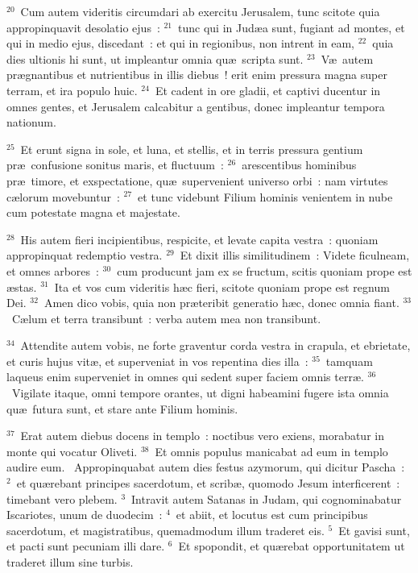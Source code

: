 ${}^{20}$~Cum autem videritis circumdari ab exercitu Jerusalem, tunc scitote quia appropinquavit desolatio ejus~:
${}^{21}$~tunc qui in Jud\ae a sunt, fugiant ad montes, et qui in medio ejus, discedant~: et qui in regionibus, non intrent in eam,
${}^{22}$~quia dies ultionis hi sunt, ut impleantur omnia qu\ae\ scripta sunt.
${}^{23}$~V\ae\ autem pr\ae gnantibus et nutrientibus in illis diebus~! erit enim pressura magna super terram, et ira populo huic.
${}^{24}$~Et cadent in ore gladii, et captivi ducentur in omnes gentes, et Jerusalem calcabitur a gentibus, donec impleantur tempora nationum.


${}^{25}$~Et erunt signa in sole, et luna, et stellis, et in terris pressura gentium pr\ae\ confusione sonitus maris, et fluctuum~:
${}^{26}$~arescentibus hominibus pr\ae\ timore, et exspectatione, qu\ae\ supervenient universo orbi~: nam virtutes c\ae lorum movebuntur~:
${}^{27}$~et tunc videbunt Filium hominis venientem in nube cum potestate magna et majestate.


${}^{28}$~His autem fieri incipientibus, respicite, et levate capita vestra~: quoniam appropinquat redemptio vestra.
${}^{29}$~Et dixit illis similitudinem~: Videte ficulneam, et omnes arbores~:
${}^{30}$~cum producunt jam ex se fructum, scitis quoniam prope est \ae stas.
${}^{31}$~Ita et vos cum videritis h\ae c fieri, scitote quoniam prope est regnum Dei.
${}^{32}$~Amen dico vobis, quia non pr\ae teribit generatio h\ae c, donec omnia fiant.
${}^{33}$~C\ae lum et terra transibunt~: verba autem mea non transibunt.


${}^{34}$~Attendite autem vobis, ne forte graventur corda vestra in crapula, et ebrietate, et curis hujus vit\ae , et superveniat in vos repentina dies illa~:
${}^{35}$~tamquam laqueus enim superveniet in omnes qui sedent super faciem omnis terr\ae .
${}^{36}$~Vigilate itaque, omni tempore orantes, ut digni habeamini fugere ista omnia qu\ae\ futura sunt, et stare ante Filium hominis.


${}^{37}$~Erat autem diebus docens in templo~: noctibus vero exiens, morabatur in monte qui vocatur Oliveti.
${}^{38}$~Et omnis populus manicabat ad eum in templo audire eum.
~Appropinquabat autem dies festus azymorum, qui dicitur Pascha~:
${}^{2}$~et qu\ae rebant principes sacerdotum, et scrib\ae , quomodo Jesum interficerent~: timebant vero plebem.
${}^{3}$~Intravit autem Satanas in Judam, qui cognominabatur Iscariotes, unum de duodecim~:
${}^{4}$~et abiit, et locutus est cum principibus sacerdotum, et magistratibus, quemadmodum illum traderet eis.
${}^{5}$~Et gavisi sunt, et pacti sunt pecuniam illi dare.
${}^{6}$~Et spopondit, et qu\ae rebat opportunitatem ut traderet illum sine turbis.


